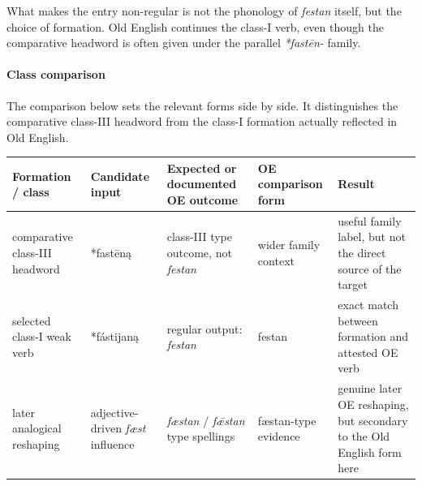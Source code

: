 \documentclass[
  british,
  a4paper,
]{article}
\newcounter{none} %
\begin{document}
What makes the entry non-regular is not the phonology of \emph{festan}
itself, but the choice of formation. Old English continues the class-I
verb, even though the comparative headword is often given under the
parallel \emph{*fastēn-} family.

\paragraph{Class comparison}\label{class-comparison}

The comparison below sets the relevant forms side by side. It
distinguishes the comparative class-III headword from the class-I
formation actually reflected in Old English.

{\def\LTcaptype{none} %
\begin{longtable}[]{@{}
  >{\raggedright\arraybackslash}p{}
  >{\raggedright\arraybackslash}p{}
  >{\raggedright\arraybackslash}p{}
  >{\raggedright\arraybackslash}p{}
  >{\raggedright\arraybackslash}p{}@{}}
\toprule\noalign{}
\begin{minipage}[b]{\linewidth}\raggedright
Formation / class
\end{minipage} & \begin{minipage}[b]{\linewidth}\raggedright
Candidate input
\end{minipage} & \begin{minipage}[b]{\linewidth}\raggedright
Expected or documented OE outcome
\end{minipage} & \begin{minipage}[b]{\linewidth}\raggedright
OE comparison form
\end{minipage} & \begin{minipage}[b]{\linewidth}\raggedright
Result
\end{minipage} \\
\midrule\noalign{}
\endhead
\bottomrule\noalign{}
\endlastfoot
comparative class-III headword & *fastēną & class-III type outcome, not
\emph{festan} & wider family context & useful family label, but not the
direct source of the target \\
selected class-I weak verb & *fástijaną & regular output: \emph{festan}
& festan & exact match between formation and attested OE verb \\
later analogical reshaping & adjective-driven \emph{fæst} influence &
\emph{fæstan} / \emph{fǣstan} type spellings & fæstan-type evidence &
genuine later OE reshaping, but secondary to the Old English form
here \\
\end{longtable}
}
\end{document}
